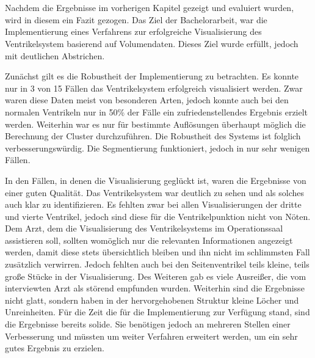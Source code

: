 \chapter{}
\label{sec:discussion}


Nachdem die Ergebnisse im vorherigen Kapitel gezeigt und evaluiert wurden, wird in diesem ein Fazit gezogen.
\newline
Das Ziel der Bachelorarbeit, war die Implementierung eines Verfahrens zur erfolgreiche Visualisierung des Ventrikelsystem basierend auf Volumendaten. Dieses Ziel wurde erfüllt, jedoch mit deutlichen Abstrichen.


Zunächst gilt es die Robustheit der Implementierung zu betrachten. Es konnte nur in 3 von 15 Fällen das Ventrikelsystem erfolgreich visualisiert werden. Zwar waren diese Daten meist von besonderen Arten, jedoch konnte auch bei den normalen Ventrikeln nur in 50\% der Fälle ein zufriedenstellendes Ergebnis erzielt werden. Weiterhin war es nur für bestimmte Auflösungen überhaupt möglich die Berechnung der Cluster durchzuführen.
\newline
Die Robustheit des Systems ist folglich verbesserungswürdig. Die Segmentierung funktioniert, jedoch in nur sehr wenigen Fällen.


In den Fällen, in denen die Visualisierung geglückt ist, waren die Ergebnisse von einer guten Qualität. Das Ventrikelsystem war deutlich zu sehen und als solches auch klar zu identifizieren.
\newline
Es fehlten zwar bei allen Visualisierungen der dritte und vierte Ventrikel, jedoch sind diese für die Ventrikelpunktion nicht von Nöten. Dem Arzt, dem die Visualisierung des Ventrikelsystems im Operationssaal assistieren soll, sollten womöglich nur die relevanten Informationen angezeigt werden, damit diese stets übersichtlich bleiben und ihn nicht im schlimmsten Fall zusätzlich verwirren.
\newline
Jedoch fehlten auch bei den Seitenventrikel teils kleine, teils große Stücke in der Visualisierung. Des Weiteren gab es viele Ausreißer, die vom interviewten Arzt als störend empfunden wurden.
\newline
Weiterhin sind die Ergebnisse nicht glatt, sondern haben in der hervorgehobenen Struktur kleine Löcher und Unreinheiten.
\newline
Für die Zeit die für die Implementierung zur Verfügung stand, sind die Ergebnisse bereits solide. Sie benötigen jedoch an mehreren Stellen einer Verbesserung und müssten um weiter Verfahren erweitert werden, um ein sehr gutes Ergebnis zu erzielen.


